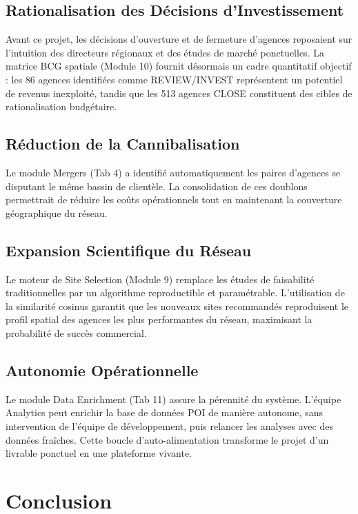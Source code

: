 \subsection{Rationalisation des Décisions d'Investissement}

Avant ce projet, les décisions d'ouverture et de fermeture d'agences reposaient sur l'intuition des directeurs régionaux et des études de marché ponctuelles. La matrice BCG spatiale (Module 10) fournit désormais un cadre quantitatif objectif : les 86 agences identifiées comme REVIEW/INVEST représentent un potentiel de revenus inexploité, tandis que les 513 agences CLOSE constituent des cibles de rationalisation budgétaire.

\subsection{Réduction de la Cannibalisation}

Le module Mergers (Tab 4) a identifié automatiquement les paires d'agences se disputant le même bassin de clientèle. La consolidation de ces doublons permettrait de réduire les coûts opérationnels tout en maintenant la couverture géographique du réseau.

\subsection{Expansion Scientifique du Réseau}

Le moteur de Site Selection (Module 9) remplace les études de faisabilité traditionnelles par un algorithme reproductible et paramétrable. L'utilisation de la similarité cosinus garantit que les nouveaux sites recommandés reproduisent le profil spatial des agences les plus performantes du réseau, maximisant la probabilité de succès commercial.

\subsection{Autonomie Opérationnelle}

Le module Data Enrichment (Tab 11) assure la pérennité du système. L'équipe Analytics peut enrichir la base de données POI de manière autonome, sans intervention de l'équipe de développement, puis relancer les analyses avec des données fraîches. Cette boucle d'auto-alimentation transforme le projet d'un livrable ponctuel en une plateforme vivante.

\section{Conclusion}


